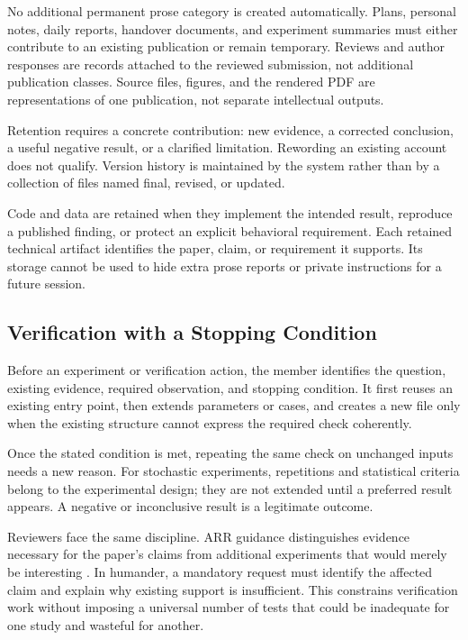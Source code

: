 \documentclass[11pt]{article}
\begin{document}
No additional permanent prose category is created automatically. Plans, personal notes, daily reports, handover documents, and experiment summaries must either contribute to an existing publication or remain temporary. Reviews and author responses are records attached to the reviewed submission, not additional publication classes. Source files, figures, and the rendered PDF are representations of one publication, not separate intellectual outputs.

Retention requires a concrete contribution: new evidence, a corrected conclusion, a useful negative result, or a clarified limitation. Rewording an existing account does not qualify. Version history is maintained by the system rather than by a collection of files named final, revised, or updated.

Code and data are retained when they implement the intended result, reproduce a published finding, or protect an explicit behavioral requirement. Each retained technical artifact identifies the paper, claim, or requirement it supports. Its storage cannot be used to hide extra prose reports or private instructions for a future session.

\subsection{Verification with a Stopping Condition}

Before an experiment or verification action, the member identifies the question, existing evidence, required observation, and stopping condition. It first reuses an existing entry point, then extends parameters or cases, and creates a new file only when the existing structure cannot express the required check coherently.

Once the stated condition is met, repeating the same check on unchanged inputs needs a new reason. For stochastic experiments, repetitions and statistical criteria belong to the experimental design; they are not extended until a preferred result appears. A negative or inconclusive result is a legitimate outcome.

Reviewers face the same discipline. ARR guidance distinguishes evidence necessary for the paper's claims from additional experiments that would merely be interesting \citep{arrguidelines}. In humander, a mandatory request must identify the affected claim and explain why existing support is insufficient. This constrains verification work without imposing a universal number of tests that could be inadequate for one study and wasteful for another.
\end{document}

